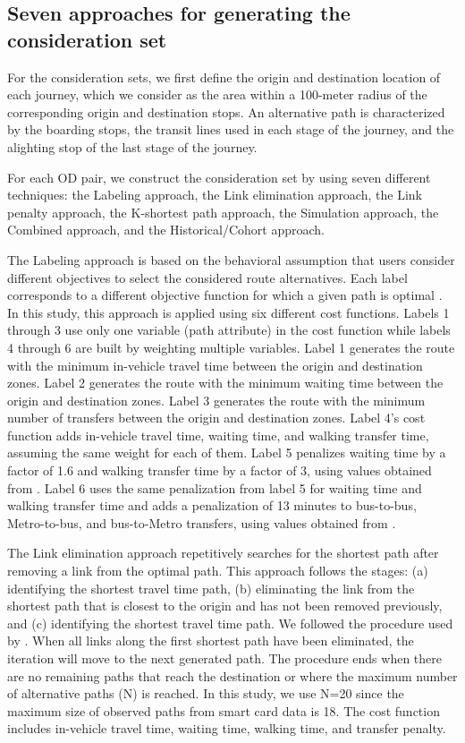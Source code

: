 \documentclass[12pt,a4paper]{article}
\begin{document}
\subsection{Seven approaches for generating the consideration set}

For the consideration sets, we first define the origin and destination location of each journey, which we consider as the area within a 100-meter radius of the corresponding origin and destination stops. An alternative path is characterized by the boarding stops, the transit lines used in each stage of the journey, and the alighting stop of the last stage of the journey. 

For each OD pair, we construct the consideration set by using seven different techniques: the Labeling approach, the Link elimination approach, the Link penalty approach, the K-shortest path approach, the Simulation approach, the Combined approach, and the Historical/Cohort approach.

The Labeling approach is based on the behavioral assumption that users consider different objectives to select the considered route alternatives. Each label corresponds to a different objective function for which a given path is optimal \citep{ben1984modelling}. In this study, this approach is applied using six different cost functions. Labels 1 through 3 use only one variable (path attribute) in the cost function while labels 4 through 6 are built by weighting multiple variables. Label 1 generates the route with the minimum in-vehicle travel time between the origin and destination zones. Label 2 generates the route with the minimum waiting time between the origin and destination zones. Label 3 generates the route with the minimum number of transfers between the origin and destination zones. Label 4’s cost function adds in-vehicle travel time, waiting time, and walking transfer time, assuming the same weight for each of them. Label 5 penalizes waiting time by a factor of 1.6 and walking transfer time by a factor of 3, using values obtained from \cite{arriagada2022unveiling}. Label 6 uses the same penalization from label 5  for waiting time and walking transfer time and adds a penalization of 13 minutes to bus-to-bus, Metro-to-bus, and bus-to-Metro transfers, using values obtained from \cite{arriagada2022unveiling}. 

The Link elimination approach repetitively searches for the shortest path after removing a link from the optimal path. This approach follows the stages: (a) identifying the shortest travel time path, (b) eliminating the link from the shortest path that is closest to the origin and has not been removed previously, and (c) identifying the shortest travel time path. We followed the procedure used by \cite{rui2016modeling}. When all links along the first shortest path have been eliminated, the iteration will move to the next generated path. The procedure ends when there are no remaining paths that reach the destination or where the maximum number of alternative paths (N) is reached. In this study, we use N=20 since the maximum size of observed paths from smart card data is 18. The cost function includes in-vehicle travel time, waiting time, walking time, and transfer penalty.
\end{document}
